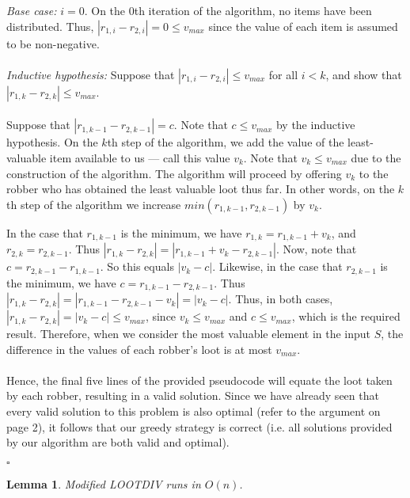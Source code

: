 \documentclass{article}
\newtheorem{lemma}[theorem]{Lemma}
\begin{document}
\noindent\textit{Base case: } $i = 0$. On the $0$th iteration of the algorithm, no items have been distributed. Thus, $|r_{1, i} - r_{2, i}| = 0 \leq v_{max}$ since the value of each item is assumed to be non-negative. \\ \\
\textit{Inductive hypothesis: } Suppose that $|r_{1, i} - r_{2, i}| \leq v_{max}$ for all $i < k$, and show that $|r_{1, k} - r_{2, k}| \leq v_{max}$. \\ \\
Suppose that $|r_{1, k-1} - r_{2, k-1}| = c$. Note that $c \leq v_{max}$ by the inductive hypothesis. On the $k$th step of the algorithm, we add the value of the least-valuable item available to us --- call this value $v_{k}$. Note that $v_{k} \leq v_{max}$ due to the construction of the algorithm. The algorithm will proceed by offering $v_{k}$ to the robber who has obtained the least valuable loot thus far. In other words, on the $k$th step of the algorithm we increase $min(r_{1, k-1}, r_{2, k-1})$ by $v_{k}$. 

In the case that $r_{1,k-1}$ is the minimum, we have $r_{1,k} = r_{1,k-1} + v_k$, and $r_{2,k} = r_{2,k-1}$. Thus $|r_{1,k} - r_{2,k}| = |r_{1,k-1} + v_k - r_{2,k-1}|$.  Now, note that $c =r_{2,k-1} - r_{1,k-1}$.  So this equals $|v_k - c|$.  Likewise, in the case that $r_{2,k-1}$ is the minimum, we have $c = r_{1,k-1} - r_{2,k-1}$.  Thus $|r_{1,k} - r_{2,k}| = |r_{1,k-1} - r_{2,k-1} - v_k| = |v_k - c|$.  Thus, in both cases, $|r_{1, k} - r_{2, k}| = |v_{k} - c| \leq v_{max}$, since $v_{k} \leq v_{max}$ and $c \leq v_{max}$, which is the required result. Therefore, when we consider the most valuable element in the input $S$, the difference in the values of each robber's loot is at most $v_{max}$. \\ \\
Hence, the final five lines of the provided pseudocode will equate the loot taken by each robber, resulting in a valid solution. Since we have already seen that every valid solution to this problem is also optimal (refer to the argument on page 2), it follows that our greedy strategy is correct (i.e. all solutions provided by our algorithm are both valid and optimal).

\begin{flushright}
$\square$
\end{flushright}

\newpage

\begin{lemma}
Modified LOOTDIV runs in $O(n)$.
\end{lemma}
\end{document}
